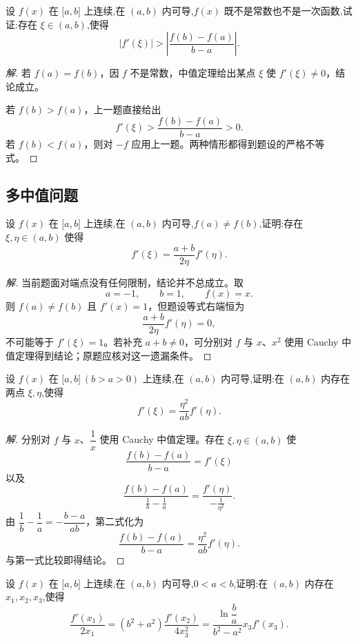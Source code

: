 \documentclass[../../数学分析培优讲义(答案版).tex]{subfiles}
\begin{document}
\begin{example}
设 $f(x)$ 在 $\lbrack a,b\rbrack$ 上连续,在 $(a,b)$ 内可导,$f(x)$ 既不是常数也不是一次函数,试证:存在 $\xi\in(a,b)$,使得
\[
    |f'(\xi)|>\left|\dfrac{f(b)-f(a)}{b-a}\right|.
\]
\end{example}

\begin{proof}[解]
若 $f(a)=f(b)$，因 $f$ 不是常数，中值定理给出某点 $\xi$ 使 $f'(\xi)\neq0$，结论成立。

若 $f(b)>f(a)$，上一题直接给出
\[
    f'(\xi)>\dfrac{f(b)-f(a)}{b-a}>0.
\]
若 $f(b)<f(a)$，则对 $-f$ 应用上一题。两种情形都得到题设的严格不等式。
\end{proof}

\subsection{多中值问题}

\begin{example}
设 $f(x)$ 在 $\lbrack a,b\rbrack$ 上连续,在 $(a,b)$ 内可导,$f(a)\neq f(b)$,证明:存在 $\xi,\eta\in(a,b)$ 使得
\[
    f'(\xi)=\dfrac{a+b}{2\eta}f'(\eta).
\]
\end{example}

\begin{proof}[解]
当前题面对端点没有任何限制，结论并不总成立。取
\[
    a=-1,
    \qquad b=1,
    \qquad f(x)=x.
\]
则 $f(a)\neq f(b)$ 且 $f'(x)=1$，但题设等式右端恒为
\[
    \dfrac{a+b}{2\eta}f'(\eta)=0,
\]
不可能等于 $f'(\xi)=1$。若补充 $a+b\neq0$，可分别对 $f$ 与 $x$、$x^2$ 使用 Cauchy 中值定理得到结论；原题应核对这一遗漏条件。
\end{proof}

\begin{example}
设 $f(x)$ 在 $\lbrack a,b\rbrack\ (b>a>0)$ 上连续,在 $(a,b)$ 内可导,证明:在 $(a,b)$ 内存在两点 $\xi,\eta$,使得
\[
    f'(\xi)=\dfrac{\eta^2}{ab}f'(\eta).
\]
\end{example}

\begin{proof}[解]
分别对 $f$ 与 $x$、$\dfrac{1}{x}$ 使用 Cauchy 中值定理。存在 $\xi,\eta\in(a,b)$ 使
\[
    \dfrac{f(b)-f(a)}{b-a}=f'(\xi)
\]
以及
\[
    \dfrac{f(b)-f(a)}{\frac{1}{b}-\frac{1}{a}}
    =\dfrac{f'(\eta)}{-\frac{1}{\eta^2}}.
\]
由 $\dfrac{1}{b}-\dfrac{1}{a}=-\dfrac{b-a}{ab}$，第二式化为
\[
    \dfrac{f(b)-f(a)}{b-a}
    =\dfrac{\eta^2}{ab}f'(\eta).
\]
与第一式比较即得结论。
\end{proof}

\begin{example}
设 $f(x)$ 在 $\lbrack a,b\rbrack$ 上连续,在 $(a,b)$ 内可导,$0<a<b$,证明:在 $(a,b)$ 内存在 $x_1,x_2,x_3$,使得
\[
    \dfrac{f'(x_1)}{2x_1}
    =(b^2+a^2)\dfrac{f'(x_2)}{4x_3^2}
    =\dfrac{\ln\dfrac{b}{a}}{b^2-a^2}x_3f'(x_3).
\]
\end{example}
\end{document}

